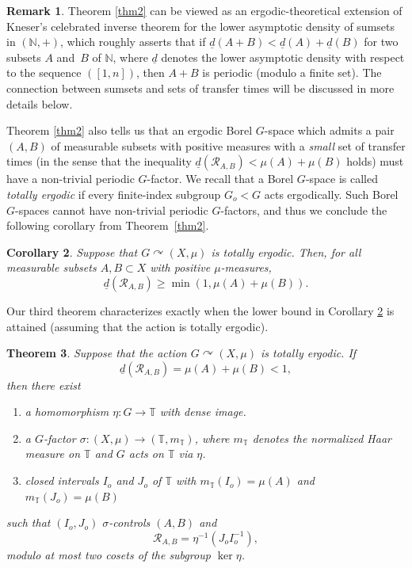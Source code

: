 \documentclass[10pt]{amsart}
\let\mathcal\mathscr
\newcommand{\cR}{\mathcal{R}}
\newcommand{\bN}{\mathbb{N}}
\newcommand{\bT}{\mathbb{T}}
\let\acts\curvearrowright
\theoremstyle{plain}
\newtheorem{theorem}{Theorem}[section]
\newtheorem{corollary}[theorem]{Corollary}
\theoremstyle{definition}
\newtheorem{remark}[theorem]{Remark}
\begin{document}
\begin{remark}
Theorem \ref{thm2} can be viewed as an ergodic-theoretical extension of Kneser's celebrated inverse theorem \cite{Kneser0} for the lower asymptotic density of sumsets in $(\bN,+)$, which roughly asserts that if $\underline{d}(A+B) < \underline{d}(A) + \underline{d}(B)$ for two subsets $A$ and~$B$
of $\bN$, where $\underline{d}$ denotes the lower asymptotic density with respect to the sequence $([1,n])$, then $A+B$ is periodic (modulo a finite set).
The connection between sumsets and sets of transfer times will be discussed in more details below.
\end{remark}

Theorem \ref{thm2} also tells us that an ergodic Borel $G$-space which admits a pair $(A,B)$ of measurable subsets with positive measures with
a \emph{small} set of transfer times (in the sense that the inequality $\underline{d}(\cR_{A,B}) < \mu(A) + \mu(B)$ holds) must have a non-trivial periodic $G$-factor. We recall that a Borel $G$-space is called \emph{totally ergodic} if every finite-index subgroup $G_o < G$ acts ergodically. Such Borel $G$-spaces cannot have non-trivial periodic $G$-factors, and thus we conclude the following corollary from Theorem~\ref{thm2}.

\begin{corollary}
\label{cor_toterg}
Suppose that $G \acts (X,\mu)$ is totally ergodic. Then, for all measurable subsets $A, B \subset X$ with positive $\mu$-measures,
\[
\underline{d}(\cR_{A,B}) \geq \min(1,\mu(A) + \mu(B)).
\]
\end{corollary}

Our third theorem characterizes exactly when the lower bound in Corollary \ref{cor_toterg} is attained (assuming that the action is totally ergodic).

\begin{theorem}
\label{thm3}
Suppose that the action $G \acts (X,\mu)$ is totally ergodic. If
\[
\underline{d}(\cR_{A,B}) = \mu(A) + \mu(B) < 1,
\]
then there exist

\begin{enumerate}
\item
a homomorphism $\eta : G \to \bT$ with dense image.
\item
a $G$-factor $\sigma : (X,\mu) \to (\bT,m_{\bT})$, where $m_{\bT}$ denotes the normalized Haar measure on $\bT$
and $G$ acts on $\bT$ via $\eta$.
\item
closed intervals $I_o$ and $J_o$ of $\bT$ with $m_{\bT}(I_o) = \mu(A)$ and $m_{\bT}(J_o) = \mu(B)$
\end{enumerate}
such that $(I_o,J_o)$ $\sigma$-controls $(A,B)$ and
\[
\cR_{A,B} = \eta^{-1}(J_o I_o^{-1}),
\]
modulo at most two cosets of the subgroup $\ker \eta$.
\end{theorem}
\end{document}
